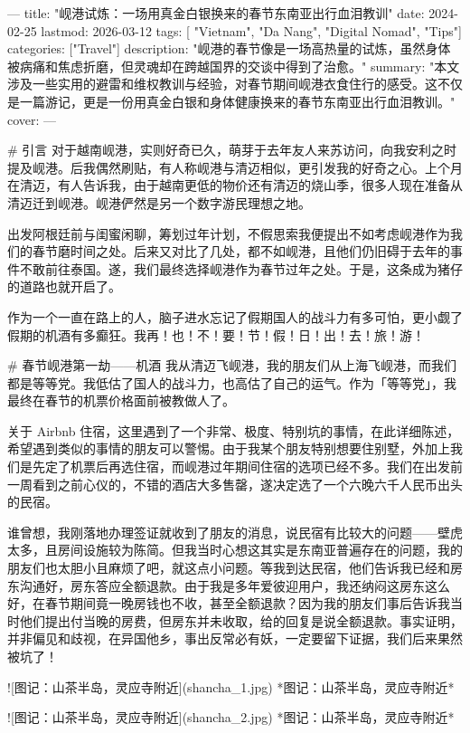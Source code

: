 ---
title: "岘港试炼：一场用真金白银换来的春节东南亚出行血泪教训"
date: 2024-02-25
lastmod: 2026-03-12
tags: [ "Vietnam", "Da Nang", "Digital Nomad", "Tips"]
categories: ["Travel"]
description: "岘港的春节像是一场高热量的试炼，虽然身体被病痛和焦虑折磨，但灵魂却在跨越国界的交谈中得到了治愈。"
summary: "本文涉及一些实用的避雷和维权教训与经验，对春节期间岘港衣食住行的感受。这不仅是一篇游记，更是一份用真金白银和身体健康换来的春节东南亚出行血泪教训。"
cover:
---

# 引言
对于越南岘港，实则好奇已久，萌芽于去年友人来苏访问，向我安利之时提及岘港。后我偶然刷贴，有人称岘港与清迈相似，更引发我的好奇之心。上个月在清迈，有人告诉我，由于越南更低的物价还有清迈的烧山季，很多人现在准备从清迈迁到岘港。岘港俨然是另一个数字游民理想之地。

出发阿根廷前与闺蜜闲聊，筹划过年计划，不假思索我便提出不如考虑岘港作为我们的春节磨时间之处。后来又对比了几处，都不如岘港，且他们仍旧碍于去年的事件不敢前往泰国。遂，我们最终选择岘港作为春节过年之处。于是，这条成为猪仔的道路也就开启了。

作为一个一直在路上的人，脑子进水忘记了假期国人的战斗力有多可怕，更小觑了假期的机酒有多癫狂。我再！也！不！要！节！假！日！出！去！旅！游！

# 春节岘港第一劫——机酒
我从清迈飞岘港，我的朋友们从上海飞岘港，而我们都是等等党。我低估了国人的战斗力，也高估了自己的运气。作为「等等党」，我最终在春节的机票价格面前被教做人了。

关于 Airbnb 住宿，这里遇到了一个非常、极度、特别坑的事情，在此详细陈述，希望遇到类似的事情的朋友可以警惕。由于我某个朋友特别想要住别墅，外加上我们是先定了机票后再选住宿，而岘港过年期间住宿的选项已经不多。我们在出发前一周看到之前心仪的，不错的酒店大多售罄，遂决定选了一个六晚六千人民币出头的民宿。

谁曾想，我刚落地办理签证就收到了朋友的消息，说民宿有比较大的问题——壁虎太多，且房间设施较为陈简。但我当时心想这其实是东南亚普遍存在的问题，我的朋友们也太胆小且麻烦了吧，就这点小问题。等我到达民宿，他们告诉我已经和房东沟通好，房东答应全额退款。由于我是多年爱彼迎用户，我还纳闷这房东这么好，在春节期间竟一晚房钱也不收，甚至全额退款？因为我的朋友们事后告诉我当时他们提出付当晚的房费，但房东并未收取，给的回复是说全额退款。事实证明，并非偏见和歧视，在异国他乡，事出反常必有妖，一定要留下证据，我们后来果然被坑了！

![图记：山茶半岛，灵应寺附近](shancha_1.jpg)
*图记：山茶半岛，灵应寺附近*

![图记：山茶半岛，灵应寺附近](shancha_2.jpg)
*图记：山茶半岛，灵应寺附近*

